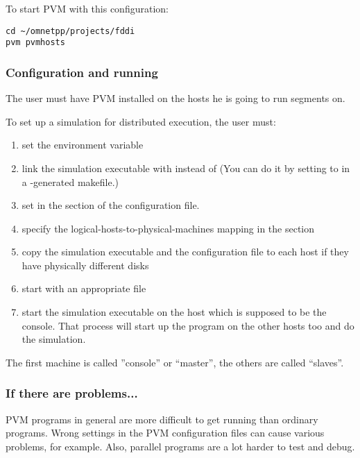 To start PVM with this configuration:

\begin{verbatim}
cd ~/omnetpp/projects/fddi
pvm pvmhosts
\end{verbatim}

\subsubsection{Configuration and running}

The user must have PVM installed on the hosts he is going to
run segments on.


To set up a simulation for distributed execution, the user must:
\begin{enumerate}
\item{set the  environment variable}
\item{link the simulation executable with  instead of
   (You can do it by setting  to
   in a -generated makefile.)}
\item{set  in the \ttt{[General]} section of the
  configuration file.}
\item{specify the logical-hosts-to-physical-machines mapping in the
  \ttt{[Machines]} section}
\item{copy the simulation executable and the configuration file to
  each host if they have physically different disks}
\item{start  with an appropriate  file}
\item{start the simulation executable on the host which is supposed to
  be the console. That process will start up the program on the other
  hosts too and do the simulation.}
\end{enumerate}

The first machine is called ''console'' or ``master'', the
others are called ``slaves''.


\subsubsection{If there are problems...}


PVM programs in general are more difficult to get running than
ordinary programs. Wrong settings in the PVM configuration files
can cause various problems, for example. Also, parallel programs
are a lot harder to test and debug.


